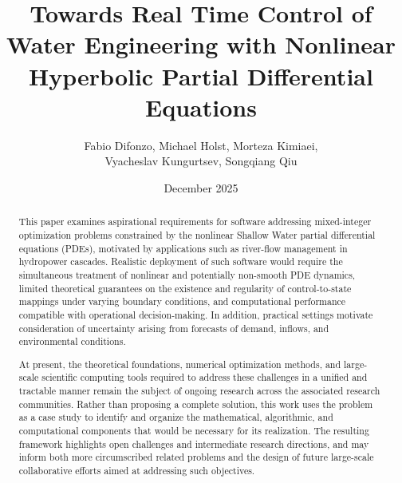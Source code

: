 \documentclass{article}
\title{Towards Real Time Control of Water Engineering with Nonlinear Hyperbolic Partial Differential Equations}
\author{Fabio Difonzo, Michael Holst, Morteza Kimiaei, \\ Vyacheslav Kungurtsev,  Songqiang Qiu}
\date{December 2025}
\newcommand{\1}{\mathds{1}}          %
\theoremstyle{definition}
\begin{document}
\maketitle

\begin{abstract}
This paper examines aspirational requirements for software addressing mixed-integer optimization problems constrained by the nonlinear Shallow Water partial differential equations (PDEs), motivated by applications such as river-flow management in hydropower cascades. Realistic deployment of such software would require the simultaneous treatment of nonlinear and potentially non-smooth PDE dynamics, limited theoretical guarantees on the existence and regularity of control-to-state mappings under varying boundary conditions, and computational performance compatible with operational decision-making. In addition, practical settings motivate consideration of uncertainty arising from forecasts of demand, inflows, and environmental conditions.

At present, the theoretical foundations, numerical optimization methods, and large-scale scientific computing tools required to address these challenges in a unified and tractable manner remain the subject of ongoing research across the associated research communities. Rather than proposing a complete solution, this work uses the problem as a case study to identify and organize the mathematical, algorithmic, and computational components that would be necessary for its realization. The resulting framework highlights open challenges and intermediate research directions, and may inform both more circumscribed related problems and the design of future large-scale collaborative efforts aimed at addressing such objectives.
\end{abstract}
\end{document}
